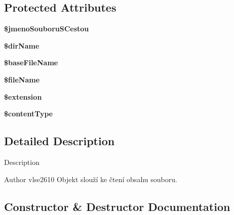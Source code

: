 \subsection*{Protected Attributes}
\begin{DoxyCompactItemize}
\item 
\mbox{\label{class_pes_1_1_readers_1_1_file_reader_a4bcfd01b5347445fbc8f6f46f95d523f}} 
{\bfseries \$jmeno\+Souboru\+S\+Cestou}
\item 
\mbox{\label{class_pes_1_1_readers_1_1_file_reader_aeae0197a14124504abb0312c6448aedd}} 
{\bfseries \$dir\+Name}
\item 
\mbox{\label{class_pes_1_1_readers_1_1_file_reader_ab5ebaff6684b28ae295ad189425721ad}} 
{\bfseries \$base\+File\+Name}
\item 
\mbox{\label{class_pes_1_1_readers_1_1_file_reader_a68fbc5a9273a24181c50a057d11603fa}} 
{\bfseries \$file\+Name}
\item 
\mbox{\label{class_pes_1_1_readers_1_1_file_reader_aed02cd2cd0ee08bd99a2ac1ef4f955ce}} 
{\bfseries \$extension}
\item 
\mbox{\label{class_pes_1_1_readers_1_1_file_reader_ab8c052d0ddebb9f14151f8682916a587}} 
{\bfseries \$content\+Type}
\end{DoxyCompactItemize}


\subsection{Detailed Description}
Description

\begin{DoxyAuthor}{Author}
vlse2610 Objekt slouží ke čtení obsahu souboru. 
\end{DoxyAuthor}


\subsection{Constructor \& Destructor Documentation}
\mbox{\label{class_pes_1_1_readers_1_1_file_reader_aac1b9b4103c3753e81a906150e17b242}} 
